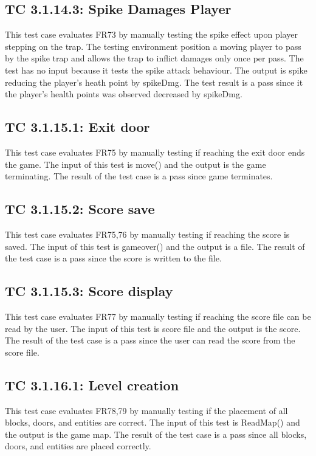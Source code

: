 \documentclass[12pt, titlepage]{article}
\begin{document}
\subsection*{TC 3.1.14.3: Spike Damages Player}
This test case evaluates FR73 by manually testing the spike effect upon player stepping on the trap. The testing environment position a moving player to pass by the spike trap and allows the trap to inflict damages only once per pass. The test has no input because it tests the spike attack behaviour. The output is spike reducing the player's heath point by spikeDmg. The test result is a pass since it the player's health points was observed decreased by spikeDmg.

\subsection*{TC 3.1.15.1: Exit door}

This test case evaluates FR75 by manually testing if reaching the exit door ends the game. The input of this test is move() and the output is the game terminating. The result of the test case is a pass since game terminates.

\subsection*{TC 3.1.15.2: Score save}

This test case evaluates FR75,76 by manually testing if reaching the score is saved. The input of this test is gameover() and the output is a file. The result of the test case is a pass since the score is written to the file.

\subsection*{TC 3.1.15.3: Score display}

This test case evaluates FR77 by manually testing if reaching the score file can be read by the user. The input of this test is score file and the output is the score. The result of the test case is a pass since the user can read the score from the score file.

\subsection*{TC 3.1.16.1: Level creation}

This test case evaluates FR78,79 by manually testing if the placement of all blocks, doors, and entities are correct. The input of this test is ReadMap() and the output is the game map. The result of the test case is a pass since all blocks, doors, and entities are placed correctly.
\end{document}

